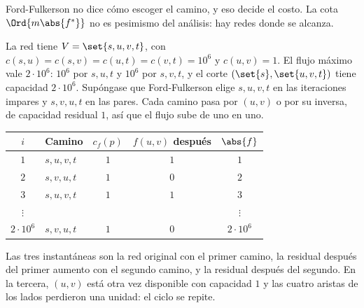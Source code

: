 \documentclass[11pt,letterpaper]{article}
\begin{document}
Ford-Fulkerson no dice cómo escoger el camino, y eso decide el costo.
La cota $\Ord{m \abs{f^*}}$ no es pesimismo del análisis: hay redes
donde se alcanza.

\begin{ejemplo}\label{ej:flujo-patologico}
  La red tiene $V = \set{s, u, v, t}$, con
  $c(s, u) = c(s, v) = c(u, t) = c(v, t) = 10^6$ y $c(u, v) = 1$. El
  flujo máximo vale $2 \cdot 10^6$: $10^6$ por $s, u, t$ y $10^6$ por
  $s, v, t$, y el corte $(\set{s}, \set{u, v, t})$ tiene capacidad
  $2 \cdot 10^6$. Supóngase que Ford-Fulkerson elige $s, u, v, t$ en
  las iteraciones impares y $s, v, u, t$ en las pares. Cada camino
  pasa por $(u, v)$ o por su inversa, de capacidad residual $1$, así
  que el flujo sube de uno en uno.
  \begin{center}
  \small
  \begin{tabular}{clccc}
    \toprule
    $i$ & \textbf{Camino} & $c_f(p)$ & $f(u, v)$ después & $\abs{f}$ \\
    \midrule
    $1$ & $s, u, v, t$ & $1$ & $1$ & $1$ \\
    $2$ & $s, v, u, t$ & $1$ & $0$ & $2$ \\
    $3$ & $s, u, v, t$ & $1$ & $1$ & $3$ \\
    $\vdots$ & & & & $\vdots$ \\
    $2 \cdot 10^6$ & $s, v, u, t$ & $1$ & $0$ & $2 \cdot 10^6$ \\
    \bottomrule
  \end{tabular}
  \end{center}
  Las tres instantáneas son la red original con el primer camino, la
  residual después del primer aumento con el segundo camino, y la
  residual después del segundo. En la tercera, $(u, v)$ está otra vez
  disponible con capacidad $1$ y las cuatro aristas de los lados
  perdieron una unidad: el ciclo se repite.
  \begin{center}
  \hspace{0.4cm}

\end{center}
\end{ejemplo}
\end{document}
